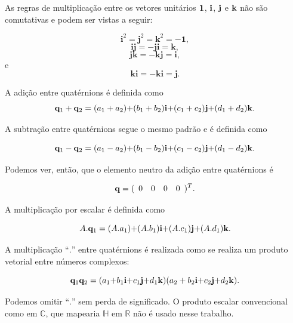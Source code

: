 As regras de multiplicação entre os vetores unitários $\mathbf{1}$,
$\mathbf{i}$, $\mathbf{j}$ e $\mathbf{k}$ não são comutativas e podem ser
vistas a seguir:

\[
\mathbf{i}^{2}=\mathbf{j}^{2}=\mathbf{k}^{2}=-\mathbf{1},
\]
\[
\mathbf{ij}=-\mathbf{ji}=\mathbf{k},
\]
\[
\mathbf{jk}=-\mathbf{kj}=\mathbf{i},
\]
e
\[
\mathbf{ki}=-\mathbf{ki}=\mathbf{j}.
\]


A adição entre quatérnions é definida como
\begin{equation}
\mathbf{\mathbf{q}}_{1}+\mathbf{q}_{2}=(a_{1}+a_{2})\mathbf{+}(b_{1}+b_{2})\mathbf{i+}(c_{1}+c_{2})\mathbf{j+}(d_{1}+d_{2})\mathbf{k}.\label{eq:DefinicaoSomaQ}
\end{equation}


A subtração entre quatérnions segue o mesmo padrão e é definida como

\begin{equation}
\mathbf{\mathbf{q}}_{1}-\mathbf{q}_{2}=(a_{1}-a_{2})\mathbf{+}(b_{1}-b_{2})\mathbf{i+}(c_{1}-c_{2})\mathbf{j+}(d_{1}-d_{2})\mathbf{k}.
\end{equation}


Podemos ver, então, que o elemento neutro da adição entre quatérnions
é 

\begin{equation}
\mathbf{q}=(\begin{array}{cccc}
0 & 0 & 0 & 0\end{array})^{T}.
\end{equation}


A multiplicação por escalar é definida como

\begin{equation}
A.\mathbf{q}_{1}=(A.a_{1})\mathbf{+}(A.b_{1})\mathbf{i+}(A.c_{1})\mathbf{j+}(A.d_{1})\mathbf{k}.\label{eq:DefinicaoMultiplicacaoPorEscalarQ}
\end{equation}


A multiplicação ``$.$'' entre quatérnions é realizada como se realiza
um produto vetorial entre números complexos:

\begin{equation}
\mathbf{q}_{1}\mathbf{q}_{2}=(a_{1}\mathbf{+}b_{1}\mathbf{i+}c_{1}\mathbf{j+}d_{1}\mathbf{k})(a_{2}+b_{2}\mathbf{i+}c_{2}\mathbf{j+}d_{2}\mathbf{k}).\label{eq:DefinicaoMultiplicacaoQ}
\end{equation}


Podemos omitir ``$.$'' sem perda de significado. O produto escalar
convencional como em $\mathbb{C}$, que mapearia $\mathbb{H}$ em
$\mathbb{R}$ não é usado nesse trabalho.

